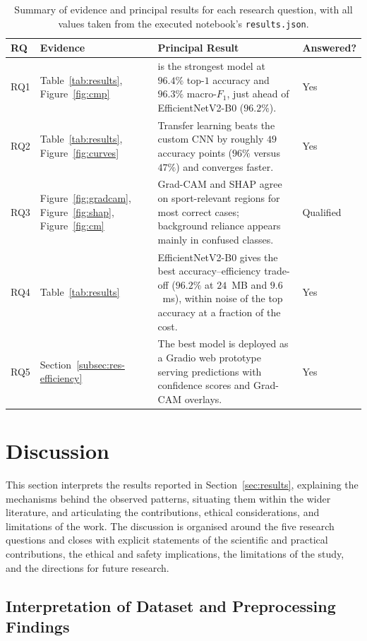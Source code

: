 \begin{table}[htbp]
\centering
\caption{Summary of evidence and principal results for each research question, with all values taken from the executed notebook's \texttt{results.json}.}
\label{tab:rqfindings}
\begin{tabular}{p{0.9cm}p{4.1cm}p{6.0cm}p{1.6cm}}
\toprule
RQ & Evidence & Principal Result & Answered? \\
\midrule
RQ1 & Table~\ref{tab:results}, Figure~\ref{fig:cmp} & \bestModel{} is the strongest model at $96.4\%$ top-$1$ accuracy and $96.3\%$ macro-$F_1$, just ahead of EfficientNetV2-B0 ($96.2\%$). & Yes \\
RQ2 & Table~\ref{tab:results}, Figure~\ref{fig:curves} & Transfer learning beats the custom CNN by roughly $49$ accuracy points ($96\%$ versus $47\%$) and converges faster. & Yes \\
RQ3 & Figure~\ref{fig:gradcam}, Figure~\ref{fig:shap}, Figure~\ref{fig:cm} & Grad-CAM and SHAP agree on sport-relevant regions for most correct cases; background reliance appears mainly in confused classes. & Qualified \\
RQ4 & Table~\ref{tab:results} & EfficientNetV2-B0 gives the best accuracy--efficiency trade-off ($96.2\%$ at $24$~MB and $9.6$~ms), within noise of the top accuracy at a fraction of the cost. & Yes \\
RQ5 & Section~\ref{subsec:res-efficiency} & The best model is deployed as a Gradio web prototype serving predictions with confidence scores and Grad-CAM overlays. & Yes \\
\bottomrule
\end{tabular}
\end{table}

\section{Discussion}
\label{sec:discussion}

This section interprets the results reported in Section~\ref{sec:results}, explaining the mechanisms behind the observed patterns, situating them within the wider literature, and articulating the contributions, ethical considerations, and limitations of the work.
The discussion is organised around the five research questions and closes with explicit statements of the scientific and practical contributions, the ethical and safety implications, the limitations of the study, and the directions for future research.

\subsection{Interpretation of Dataset and Preprocessing Findings}
\label{subsec:disc-dataset}

